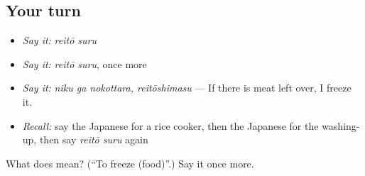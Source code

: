 \subsection*{Your turn}
\begin{itemize}
\raggedright
  \item \emph{Say it:} \emph{reitō suru}
  \item \emph{Say it:} \emph{reitō suru}, once more
  \item \emph{Say it:} \emph{niku ga nokottara, reitōshimasu} — If there is meat left over, I freeze it.
  \item \emph{Recall:} say the Japanese for a rice cooker, then the Japanese for the washing-up, then say \emph{reitō suru} again
\end{itemize}

\begin{tcolorbox}[breakable,colback=teal!4,colframe=teal!35!black,title={Before you move on}]
What does  mean? (\textquotedblleft{}To freeze (food)\textquotedblright{}.) Say it once more.
\end{tcolorbox}
